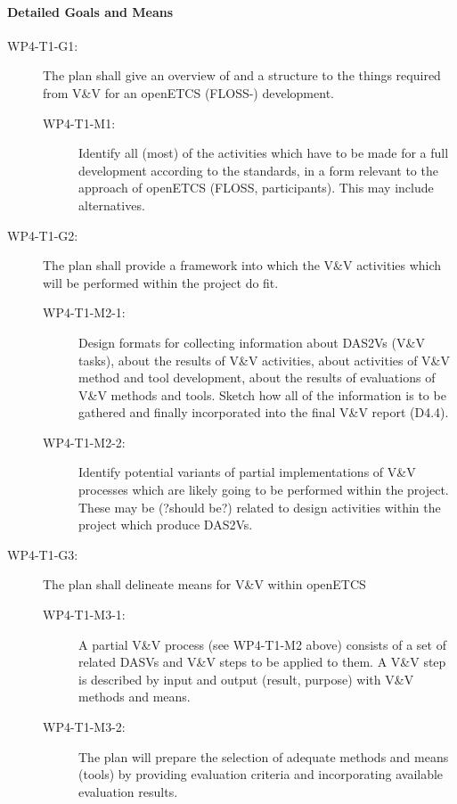 \documentclass{template/openetcs_report}
\begin{document}
{\it 
\paragraph{Detailed Goals and Means}
\label{sec:detailed-goals-means}

\begin{description}
\item[WP4-T1-G1:] The plan shall give an overview of and a structure to
  the things required from V\&V for an openETCS (FLOSS-) development.
  \begin{description}
  \item[WP4-T1-M1:] Identify all (most) of the activities which have
    to be made for a full development according to the standards, in a
    form relevant to the approach of openETCS (FLOSS,
    participants). This may include alternatives.
  \end{description}
\item[WP4-T1-G2:] The plan shall provide a framework into which the V\&V
  activities which will be performed within the project do fit.
  \begin{description}
  \item[WP4-T1-M2-1:] Design formats for collecting information about
    DAS2Vs (V\&V tasks), about the results of V\&V activities, about
    activities of V\&V method and tool development, about the results
    of evaluations of V\&V methods and tools. Sketch how all of the
    information is to be gathered and finally incorporated into the
    final V\&V report (D4.4).
  \item[WP4-T1-M2-2:] Identify potential variants of partial
    implementations of V\&V processes which are likely going to be
    performed within the project. These may be (?should be?) related
    to design activities within the project which produce DAS2Vs.
  \end{description}
\item[WP4-T1-G3:] The plan shall delineate means for V\&V within openETCS
  \begin{description}
  \item[WP4-T1-M3-1:] A partial V\&V process (see WP4-T1-M2 above)
    consists of a set of related DASVs and V\&V steps to be applied to
    them. A V\&V step is described by input and output (result,
    purpose) with V\&V methods and means.
  \item[WP4-T1-M3-2:] The plan will prepare the selection of adequate
    methods and means (tools) by providing evaluation criteria and
    incorporating available evaluation results.

\end{description}
\end{description}}
\end{document}
